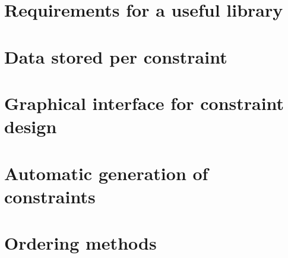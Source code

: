 \section{Requirements for a useful library}


\section{Data stored per constraint}


\section{Graphical interface for constraint design}


\section{Automatic generation of constraints}


\section{Ordering methods}
